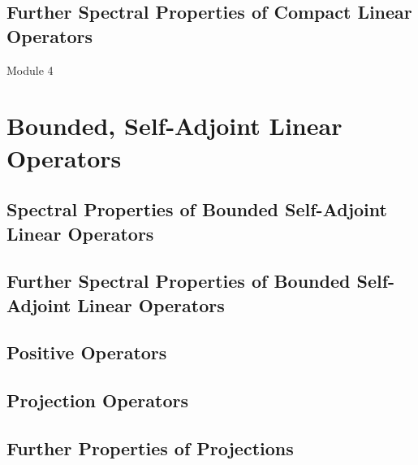\subsection{Further Spectral Properties of Compact Linear Operators}
\pagebreak

{\Large Module 4}
\section{Bounded, Self-Adjoint Linear Operators}
\subsection{Spectral Properties of Bounded Self-Adjoint Linear Operators}
\subsection{Further Spectral Properties of Bounded Self-Adjoint Linear Operators}
\subsection{Positive Operators}
\setcounter{subsection}{4}
\subsection{Projection Operators}
\subsection{Further Properties of Projections}
